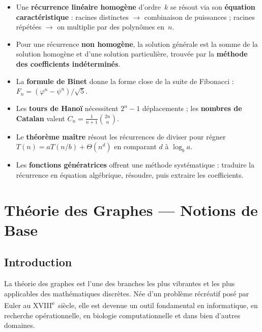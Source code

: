 \documentclass[12pt,a4paper,openany]{book}
\theoremstyle{definition}
\theoremstyle{plain}
\theoremstyle{remark}
\begin{document}
\begin{itemize}
  \item Une \textbf{récurrence linéaire homogène} d'ordre~$k$ se résout via son
    \textbf{équation caractéristique} : racines distinctes $\to$ combinaison de
    puissances ; racines répétées $\to$ on multiplie par des polynômes en~$n$.
  \item Pour une récurrence \textbf{non homogène}, la solution générale est
    la somme de la solution homogène et d'une solution particulière, trouvée par
    la \textbf{méthode des coefficients indéterminés}.
  \item La \textbf{formule de Binet} donne la forme close de la suite de
    Fibonacci : $F_n = (\varphi^n - \psi^n)/\sqrt{5}$.
  \item Les \textbf{tours de Hanoï} nécessitent $2^n - 1$ déplacements ; les
    \textbf{nombres de Catalan} valent $C_n = \frac{1}{n+1}\binom{2n}{n}$.
  \item Le \textbf{théorème maître} résout les récurrences de diviser pour régner
    $T(n) = aT(n/b) + \Theta(n^d)$ en comparant $d$ à $\log_b a$.
  \item Les \textbf{fonctions génératrices} offrent une méthode systématique :
    traduire la récurrence en équation algébrique, résoudre, puis extraire les
    coefficients.
\end{itemize}

\newpage

\chapter{Théorie des Graphes --- Notions de Base}
\label{ch:graphes}

\minitoc

\section*{Introduction}

La théorie des graphes est l'une des branches les plus vibrantes
et les plus applicables des mathématiques discrètes. Née d'un problème
récréatif posé par Euler au XVIII\textsuperscript{e}~siècle, elle est devenue
un outil fondamental en informatique, en recherche opérationnelle, en biologie
computationnelle et dans bien d'autres domaines.
\end{document}
